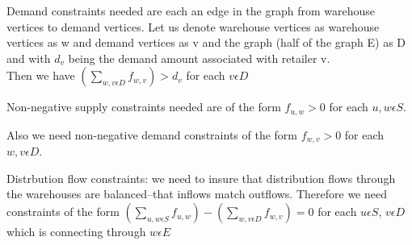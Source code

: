 Demand constraints needed are each an edge in the graph from warehouse vertices to demand vertices.  Let us denote warehouse vertices as
warehouse vertices as w and demand vertices as v and the graph (half of the graph E) as D and with $d_v$ being the demand amount associated with retailer v.\\
Then we have $(\sum\limits_{w,v\epsilon D} f_{w,v})>d_v$ for each $v \epsilon D$

Non-negative supply constraints needed are of the form $f_{u,w}>0$ for each $u,w \epsilon S$.

Also we need non-negative demand constraints of the form  $f_{w,v}>0$ for each $w,v \epsilon D$.

Distrbution flow constraints:  we need to insure that distribution flows through the warehouses are balanced--that inflows match outflows.  Therefore we need constraints of the form $(\sum\limits_{u,w\epsilon S} f_{u,w}) - (\sum\limits_{w,v\epsilon D} f_{w,v}) = 0$ for each $u \epsilon S$, 
$v \epsilon D$ which is connecting through $w \epsilon E$
